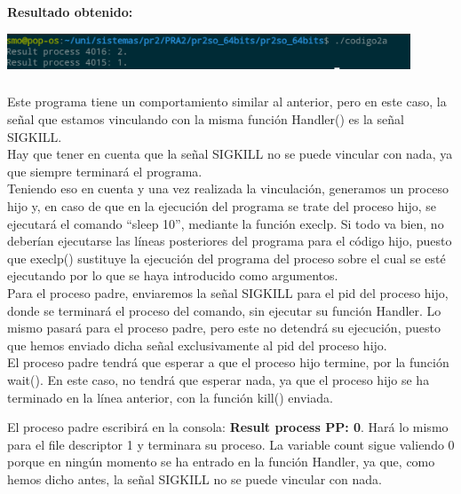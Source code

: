 \documentclass[spanish]{article}
\begin{document}
\textbf{Resultado obtenido:}\\

\begin{center}
\includegraphics[width=12cm]{../img/3.png}
\end{center}

\subsubsection{}

Este programa tiene un comportamiento similar al anterior,
pero en este caso, la señal que estamos vinculando con la
misma función Handler() es la señal SIGKILL.\\

Hay que tener en cuenta que la señal SIGKILL no se puede
vincular con nada, ya que siempre terminará el programa.\\

Teniendo eso en cuenta y una vez realizada la vinculación, generamos un proceso hijo
y, en caso de que en la ejecución del programa se trate del
proceso hijo, se ejecutará el comando ``sleep 10'', mediante
la función execlp. Si todo va bien, no deberían ejecutarse
las líneas posteriores del programa para el código hijo,
puesto que execlp() sustituye la ejecución del programa del
proceso sobre el cual se esté ejecutando por lo que se haya
introducido como argumentos.\\

Para el proceso padre, enviaremos la señal SIGKILL para el pid
del proceso hijo, donde se terminará el proceso del comando,
sin ejecutar su función Handler. Lo mismo pasará para el
proceso padre, pero este no detendrá su ejecución, puesto
que hemos enviado dicha señal exclusivamente al pid del
proceso hijo.\\

El proceso padre tendrá que esperar a que el proceso hijo
termine, por la función wait(). En este caso, no tendrá que
esperar nada, ya que el proceso hijo se ha terminado en la
línea anterior, con la función kill() enviada.

El proceso padre escribirá en la consola: \textbf{Result
process PP: 0}. Hará lo mismo para el file descriptor 1 y
terminara su proceso. La variable count sigue valiendo 0
porque en ningún momento se ha entrado en la función
Handler, ya que, como hemos dicho antes, la señal SIGKILL no
se puede vincular con nada.\\
\end{document}
